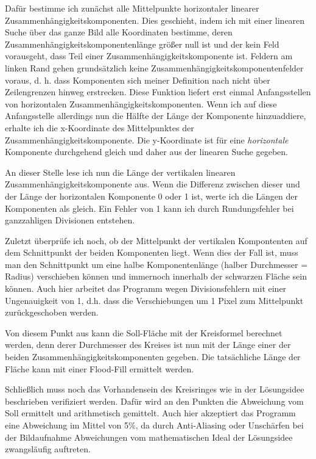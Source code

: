 Dafür bestimme ich zunächst alle Mittelpunkte horizontaler linearer Zusammenhängigkeitskomponenten. Dies geschieht, indem ich mit einer linearen Suche über das ganze Bild alle Koordinaten bestimme, deren Zusammenhängigkeitskomponentenlänge größer null ist und der kein Feld vorausgeht, dass Teil einer Zusammenhängigkeitskomponente ist. Feldern am linken Rand gehen grundsätzlich keine Zusammenhängigkeitskomponentenfelder voraus, d. h. dass Komponenten sich meiner Definition nach nicht über Zeilengrenzen hinweg erstrecken. Diese Funktion liefert erst einmal Anfangsstellen von horizontalen Zusammenhängigkeitskomponenten. Wenn ich auf diese Anfangsstelle allerdings nun die Hälfte der Länge der Komponente hinzuaddiere, erhalte ich die x-Koordinate des Mittelpunktes der Zusammenhängigkeitskomponente. Die y-Koordinate ist für eine \textit{horizontale} Komponente durchgehend gleich und daher aus der linearen Suche gegeben.

An dieser Stelle lese ich nun die Länge der vertikalen linearen Zusammenhängigkeitskomponente aus. Wenn die Differenz zwischen dieser und der Länge der horizontalen Komponente 0 oder 1 ist, werte ich die Längen der Komponenten als gleich. Ein Fehler von 1 kann ich durch Rundungsfehler bei ganzzahligen Divisionen entstehen.

Zuletzt überprüfe ich noch, ob der Mittelpunkt der vertikalen Kompontenten auf dem Schnittpunkt der beiden Komponenten liegt. Wenn dies der Fall ist, muss man den Schnittpunkt um eine halbe Komponentenlänge (halber Durchmesser = Radius) verschieben können und immernoch innerhalb der schwarzen Fläche sein können. Auch hier arbeitet das Programm wegen Divisionsfehlern mit einer Ungenauigkeit von 1, d.h. dass die Verschiebungen um 1 Pixel zum Mittelpunkt zurückgeschoben werden.

Von diesem Punkt aus kann die Soll-Fläche mit der Kreisformel berechnet werden, denn derer Durchmesser des Kreises ist nun mit der Länge einer der beiden Zusammenhängigkeitskomponenten gegeben. Die tatsächliche Länge der Fläche kann mit einer Flood-Fill ermittelt werden.

Schließlich muss noch das Vorhandensein des Kreisringes wie in der Lösungsidee beschrieben verifiziert werden. Dafür wird an den Punkten die Abweichung vom Soll ermittelt und arithmetisch gemittelt. Auch hier akzeptiert das Programm eine Abweichung im Mittel von 5\%, da durch Anti-Aliasing oder Unschärfen bei der Bildaufnahme Abweichungen vom mathematischen Ideal der Lösungsidee zwangsläufig auftreten.
\pagebreak
